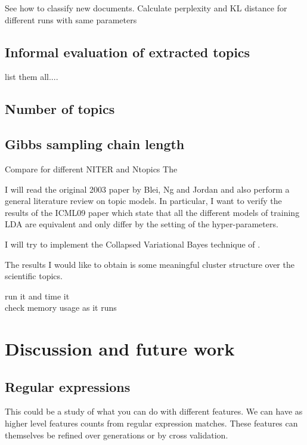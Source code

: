 \documentclass[11pt]{article}
\begin{document}
    See how to classify new documents.
    Calculate perplexity and KL distance for different runs with same parameters

    \subsection{Informal evaluation of extracted topics}

        list them all....


    \subsection{Number of topics}



    \subsection{Gibbs sampling chain length}

    Compare for different NITER and Ntopics
        The 


	I will read the original 2003 paper by Blei, Ng and Jordan \cite{Blei2003} and also perform a general literature
	review on topic models.
	In particular, I want to verify the results of the ICML09 paper \cite{Teh2009} which state that all the different 
	models of training
	LDA are equivalent and only differ by the setting of the hyper-parameters.
	
	I will try to implement the Collapsed Variational Bayes technique of \cite{Teh2007}.
	
	The results I would like to obtain is some meaningful cluster structure over the scientific topics.
	
    run it and time it \\ 
    check memory usage as it runs \\
	
	
\section{Discussion and future work}

	\subsection{Regular expressions}
	
		This could be a study of what you can do with different features.
		We can have as higher level features counts from regular expression matches.
		These features can themselves be refined over generations or by cross validation.
		
\end{document}
